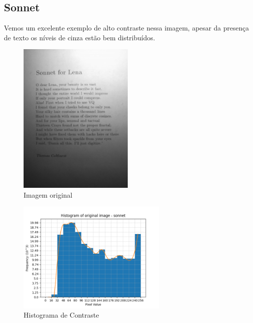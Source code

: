 \documentclass[12pt, letterpaper]{article}
\begin{document}
    \subsection{Sonnet}
        Vemos um excelente exemplo de alto contraste nessa imagem, apesar da presença de texto os níveis de cinza estão bem distribuídos.
        \begin{figure}[H]
            \label{hist:sonnet}
            \centering
            \includegraphics[width=0.5\textwidth]{sonnet.png}
            \\{Imagem original}

            \includegraphics[width=0.65\textwidth]{sonnet_histogram.png}
            \\{Histograma de Contraste}
        \end{figure}
\end{document}

